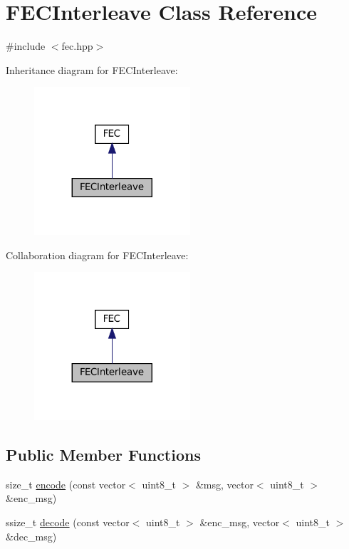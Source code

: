 \hypertarget{classFECInterleave}{}\section{F\+E\+C\+Interleave Class Reference}
\label{classFECInterleave}


{\ttfamily \#include $<$fec.\+hpp$>$}



Inheritance diagram for F\+E\+C\+Interleave\+:\nopagebreak
\begin{figure}[H]
\begin{center}
\leavevmode
\includegraphics[width=164pt]{classFECInterleave__inherit__graph}
\end{center}
\end{figure}


Collaboration diagram for F\+E\+C\+Interleave\+:\nopagebreak
\begin{figure}[H]
\begin{center}
\leavevmode
\includegraphics[width=164pt]{classFECInterleave__coll__graph}
\end{center}
\end{figure}
\subsection*{Public Member Functions}
\begin{DoxyCompactItemize}
\item 
size\+\_\+t \hyperlink{classFECInterleave_a10d868d7b117193667d0406edec2ef59}{encode} (const vector$<$ uint8\+\_\+t $>$ \&msg, vector$<$ uint8\+\_\+t $>$ \&enc\+\_\+msg)
\item 
ssize\+\_\+t \hyperlink{classFECInterleave_a7e45a890ff7061e0a5c3234d29ac8954}{decode} (const vector$<$ uint8\+\_\+t $>$ \&enc\+\_\+msg, vector$<$ uint8\+\_\+t $>$ \&dec\+\_\+msg)
\end{DoxyCompactItemize}
